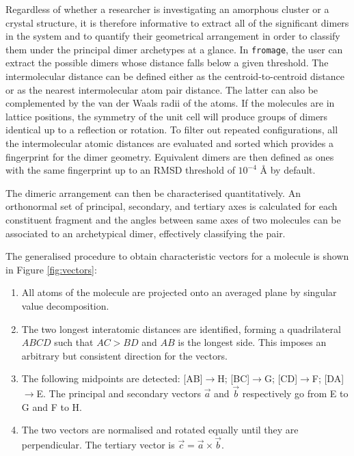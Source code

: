 Regardless of whether a researcher is investigating an amorphous cluster or a crystal structure, it is therefore informative to extract all of the significant dimers in the system and to quantify their geometrical arrangement in order to classify them under the principal dimer archetypes at a glance. In \texttt{fromage}, the user can extract the possible dimers whose distance falls below a given threshold. The intermolecular distance can be defined either as the centroid-to-centroid distance or as the nearest intermolecular atom pair distance. The latter can also be complemented by the van der Waals radii of the atoms. If the molecules are in lattice positions, the symmetry of the unit cell will produce groups of dimers identical up to a reflection or rotation. To filter out repeated configurations, all the intermolecular atomic distances are evaluated and sorted which provides a fingerprint for the dimer geometry. Equivalent dimers are then defined as ones with the same fingerprint up to an RMSD threshold of $10^{-4}$ \AA{} by default.

The dimeric arrangement can then be characterised quantitatively. An orthonormal set of principal, secondary, and tertiary axes is calculated for each constituent fragment and the angles between same axes of two molecules can be associated to an archetypical dimer, effectively classifying the pair.


The generalised procedure to obtain characteristic vectors for a molecule is shown in Figure \ref{fig:vectors}:
\begin{enumerate}
    \item All atoms of the molecule are projected onto an averaged plane by singular value decomposition.
    \item The two longest interatomic distances are identified, forming a quadrilateral $ABCD$ such that $AC > BD$ and $AB$ is the longest side. This imposes an arbitrary but consistent direction for the vectors.
    \item The following midpoints are detected: [AB]$\rightarrow${}H; [BC]$\rightarrow${}G; [CD]$\rightarrow${}F; [DA]$\rightarrow${}E. The principal and secondary vectors $\vec{a}$ and $\vec{b}$ respectively go from E to G and F to H.
    \item The two vectors are normalised and rotated equally until they are perpendicular. The tertiary vector is $\vec{c} = \vec{a}\times\vec{b}$.
\end{enumerate}

